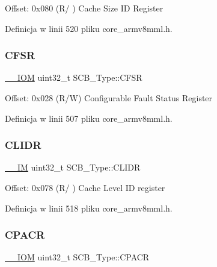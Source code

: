 Offset\+: 0x080 (R/ ) Cache Size ID Register 

Definicja w linii 520 pliku core\+\_\+armv8mml.\+h.

\mbox{\label{struct_s_c_b___type_a0cda9e061b42373383418663092ad19a}} 
\subsubsection{\texorpdfstring{C\+F\+SR}{CFSR}}
{\footnotesize\ttfamily \hyperlink{core__sc300_8h_ab6caba5853a60a17e8e04499b52bf691}{\+\_\+\+\_\+\+I\+OM} uint32\+\_\+t S\+C\+B\+\_\+\+Type\+::\+C\+F\+SR}

Offset\+: 0x028 (R/W) Configurable Fault Status Register 

Definicja w linii 507 pliku core\+\_\+armv8mml.\+h.

\mbox{\label{struct_s_c_b___type_ad9899f5775251cf5ef0cb0845527afc2}} 
\subsubsection{\texorpdfstring{C\+L\+I\+DR}{CLIDR}}
{\footnotesize\ttfamily \hyperlink{core__sc300_8h_a4cc1649793116d7c2d8afce7a4ffce43}{\+\_\+\+\_\+\+IM} uint32\+\_\+t S\+C\+B\+\_\+\+Type\+::\+C\+L\+I\+DR}

Offset\+: 0x078 (R/ ) Cache Level ID register 

Definicja w linii 518 pliku core\+\_\+armv8mml.\+h.

\mbox{\label{struct_s_c_b___type_ac6a860c1b8d8154a1f00d99d23b67764}} 
\subsubsection{\texorpdfstring{C\+P\+A\+CR}{CPACR}}
{\footnotesize\ttfamily \hyperlink{core__sc300_8h_ab6caba5853a60a17e8e04499b52bf691}{\+\_\+\+\_\+\+I\+OM} uint32\+\_\+t S\+C\+B\+\_\+\+Type\+::\+C\+P\+A\+CR}

